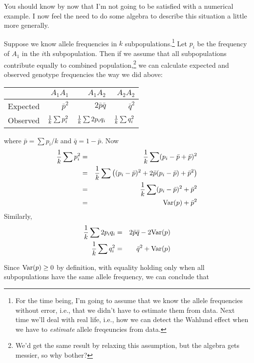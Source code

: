 \documentclass[12pt]{article}
\begin{document}
You should know by now that I'm not going to be satisfied with a
numerical example. I now feel the need to do some algebra to describe
this situation a little more generally.

Suppose we know allele frequencies in $k$ subpopulations.\footnote{For
  the time being, I'm going to assume that we know the allele
  frequencies without error, i.e., that we didn't have to estimate
  them from data. Next time we'll deal with real life, i.e., how we
  can detect the Wahlund effect when we have to {\it estimate\/}
  allele freqeuncies from data.} Let $p_i$ be the frequency of $A_1$
in the $i$th subpopulation. Then if we assume that all subpopulations
contribute equally to combined population,\footnote{We'd get the same
  result by relaxing this assumption, but the algebra gets messier, so
  why bother?} we can calculate expected and observed genotype
frequencies the way we did above:

\begin{center}
\begin{tabular}{l|rrr}
\hline\hline
         & $A_1A_1$       & $A_1A_2$         & $A_2A_2$ \\
\hline
Expected & $\bar p^2$     & $2\bar p\bar q$  & $\bar q^2$ \\
Observed & $\frac{1}{k}\sum p_i^2$ & $\frac{1}{k}\sum 2p_iq_i$ & $\frac{1}{k}\sum q_i^2$ \\
\hline
\end{tabular}
\end{center}
where $\bar p = \sum p_i/k$ and $\bar q = 1 - \bar p$. Now
\begin{eqnarray}
\frac{1}{k}\sum p_i^2 &=& \frac{1}{k}\sum (p_i - \bar p + \bar p)^2 \\
&=& \frac{1}{k}\sum \left((p_i - \bar p)^2 + 2\bar p(p_i - \bar p)
                            + \bar p^2\right) \\
             &=& \frac{1}{k}\sum (p_i - \bar p)^2 + \bar p^2 \\
             &=& \hbox{Var}(p) + \bar p^2 \label{eq:p2}
\end{eqnarray}
Similarly,
\begin{eqnarray}
\frac{1}{k}\sum 2p_iq_i &=& 2\bar p\bar q - 2\hbox{Var}(p) \label{eq:2pq} \\
\frac{1}{k}\sum q_i^2   &=& \bar q^2 + \hbox{Var}(p) \label{eq:q2}
\end{eqnarray}

Since $\hbox{Var}(p) \ge 0$ by definition, with equality holding only
when all subpopulations have the same allele frequency, we can
conclude that
\end{document}
